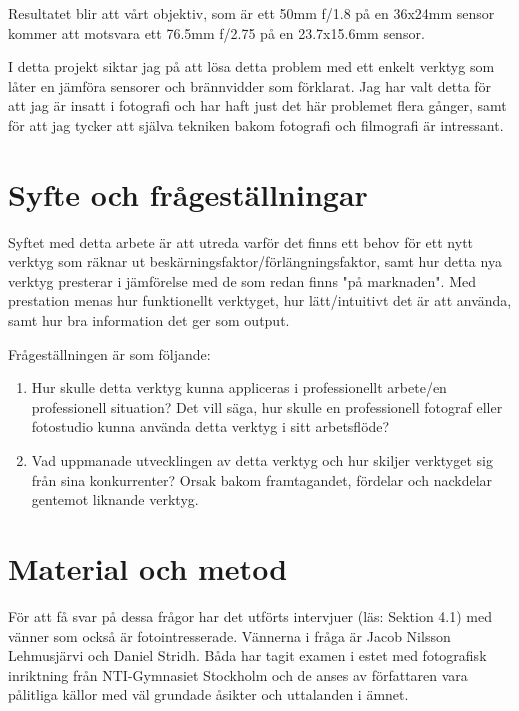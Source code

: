 \documentclass[11pt]{article}
\begin{document}
Resultatet blir att vårt objektiv, som är ett 50mm f/1.8 på en 36x24mm sensor
kommer att motsvara ett 76.5mm f/2.75 på en 23.7x15.6mm sensor.

\bigskip
I detta projekt siktar jag på att lösa detta problem med ett enkelt verktyg som
låter en jämföra sensorer och brännvidder som förklarat. Jag har valt detta för
att jag är insatt i fotografi och har haft just det här problemet flera gånger,
samt för att jag tycker att själva tekniken bakom fotografi och filmografi är
intressant.\par

\section{Syfte och frågeställningar}
Syftet med detta arbete är att utreda varför det finns ett behov
för ett nytt verktyg som räknar ut beskärningsfaktor/förlängningsfaktor, samt
hur detta nya verktyg presterar i jämförelse med de som redan finns "på
marknaden". Med prestation menas hur funktionellt verktyget, hur lätt/intuitivt
det är att använda, samt hur bra information det ger som output.

Frågeställningen är som följande:\par

\begin{enumerate}
    \item Hur skulle detta verktyg kunna appliceras i professionellt arbete/en
        professionell situation? Det vill säga, hur skulle en professionell
        fotograf eller fotostudio kunna använda detta verktyg i sitt
        arbetsflöde?
    \item Vad uppmanade utvecklingen av detta verktyg och hur skiljer verktyget
        sig från sina konkurrenter? Orsak bakom framtagandet, fördelar och
        nackdelar gentemot liknande verktyg.
\end{enumerate}

\section{Material och metod}
\sloppy
För att få svar på dessa frågor har det utförts intervjuer (läs: Sektion 4.1)
med vänner som också är fotointresserade. Vännerna i fråga är Jacob Nilsson
Lehmusjärvi och Daniel Stridh. Båda har tagit examen i estet med fotografisk
inriktning från NTI-Gymnasiet Stockholm och de anses av författaren vara
pålitliga källor med väl grundade åsikter och uttalanden i ämnet.\par
\end{document}
